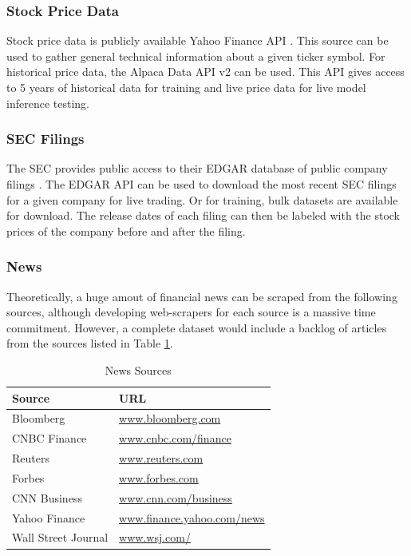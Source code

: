\documentclass[conference]{IEEEtran}
\begin{document}
\subsubsection{Stock Price Data}
Stock price data is publicly available Yahoo Finance API \cite{yahoofinanceapi}. This source can be used to gather general technical information about a given ticker symbol. 
For historical price data, the Alpaca Data API v2 \cite{alpacadataapi} can be used. This API gives access to 5 years of historical data for training and live price data for live model inference testing. 
\subsubsection{SEC Filings}
The SEC provides public access to their EDGAR database of public company filings \cite{Sec.gov_2021}. The EDGAR API can be used to download the most recent SEC filings for a given company for live trading. Or for training, bulk datasets are available for download. The release dates of each filing can then be labeled with the stock prices of the company before and after the filing.
\subsubsection{News}
Theoretically, a huge amout of financial news can be scraped from the following sources, although developing web-scrapers for each source is a massive time commitment. However, a complete dataset would include a backlog of articles from the sources listed in Table \ref{table:newsSources}.
\begin{table}[ht]
    \caption{News Sources}
    \centering
    \begin{tabular}{|l|l|}
        \hline
        \textbf{Source} & \textbf{URL} \\
        \hline
        Bloomberg & \href{https://www.bloomberg.com/}{www.bloomberg.com} \\
        \hline
        CNBC Finance & \href{https://www.cnbc.com/finance/}{www.cnbc.com/finance} \\
        \hline
        Reuters & \href{https://www.reuters.com/}{www.reuters.com} \\
        \hline
        Forbes & \href{https://www.forbes.com/}{www.forbes.com} \\
        \hline
        CNN Business & \href{https://www.cnn.com/business}{www.cnn.com/business} \\
        \hline
        Yahoo Finance & \href{https://finance.yahoo.com/news}{www.finance.yahoo.com/news} \\
        \hline
        Wall Street Journal & \href{https://www.wsj.com/}{www.wsj.com/} \\
        \hline
    \end{tabular}
    \label{table:newsSources}
\end{table}
\end{document}
